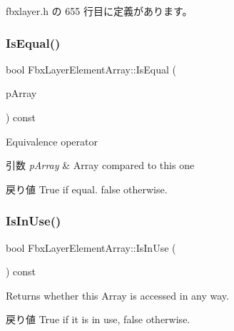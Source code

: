  fbxlayer.\+h の 655 行目に定義があります。

\mbox{\label{class_fbx_layer_element_array_a3e34cd89f4c2becbf6d114ac08de40ce}} 
\subsubsection{\texorpdfstring{Is\+Equal()}{IsEqual()}}
{\footnotesize\ttfamily bool Fbx\+Layer\+Element\+Array\+::\+Is\+Equal (\begin{DoxyParamCaption}\item[{const \hyperlink{class_fbx_layer_element_array}{Fbx\+Layer\+Element\+Array} \&}]{p\+Array }\end{DoxyParamCaption}) const}

Equivalence operator 
\begin{DoxyParams}{引数}
{\em p\+Array} & Array compared to this one \\
\hline
\end{DoxyParams}
\begin{DoxyReturn}{戻り値}
{\ttfamily True} if equal. {\ttfamily false} otherwise. 
\end{DoxyReturn}
\mbox{\label{class_fbx_layer_element_array_a83e174dd9818d314a274bd87f7b9aa38}} 
\subsubsection{\texorpdfstring{Is\+In\+Use()}{IsInUse()}}
{\footnotesize\ttfamily bool Fbx\+Layer\+Element\+Array\+::\+Is\+In\+Use (\begin{DoxyParamCaption}{ }\end{DoxyParamCaption}) const}

Returns whether this Array is accessed in any way. \begin{DoxyReturn}{戻り値}
{\ttfamily True} if it is in use, {\ttfamily false} otherwise. 
\end{DoxyReturn}
\mbox{\label{class_fbx_layer_element_array_a16cf9a248965cbe26d932c3fb6869c85}} 
